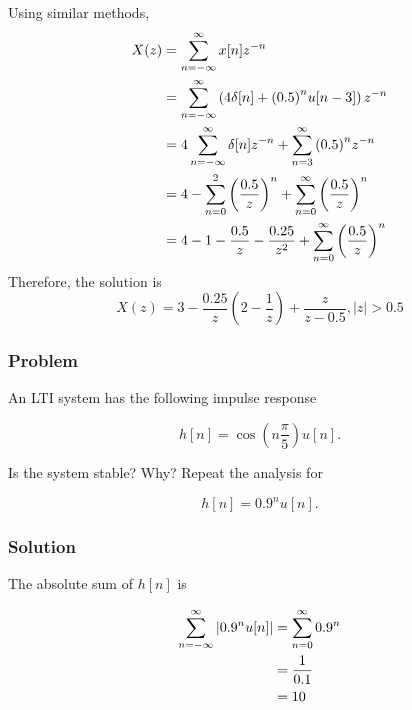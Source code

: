 Using similar methods,
	\begin{equation}
	\begin{aligned}
  X(z) &= \sum\limits_{n =  - \infty }^\infty  {x[n]{z^{ - n}}}  \hfill \\
   &= \sum\limits_{n =  - \infty }^\infty  {\left( {4\delta [n] + {{\left( {0.5} \right)}^n}u[n - 3]} \right){z^{ - n}}}  \hfill \\
   &= 4\sum\limits_{n =  - \infty }^\infty  {\delta [n]} {z^{ - n}} + \sum\limits_{n = 3}^\infty  {{{\left( {0.5} \right)}^n}{z^{ - n}}}  \hfill \\
   &= 4 - \sum\limits_{n = 0}^2 {{{\left( {\frac{{0.5}}{z}} \right)}^n}}  + \sum\limits_{n = 0}^\infty  {{{\left( {\frac{{0.5}}{z}} \right)}^n}}  \hfill \\
   &= 4 - 1 - \frac{{0.5}}{z} - \frac{{0.25}}{{{z^2}}} + \sum\limits_{n = 0}^\infty  {{{\left( {\frac{{0.5}}{z}} \right)}^n}}  \hfill \\
\end{aligned} 
	\end{equation}
	Therefore, the solution is
	\begin{equation}
	X(z)= 3 - \frac{{0.25}}{z}\left( {2 - \frac{1}{z}} \right) + \frac{z}{{z - 0.5}},\left| z \right| > 0.5 
    \end{equation}

\subsubsection{Problem}

An LTI system has the following impulse response 

\begin{equation}
h[n]=\cos\left( n\frac{\pi}{5}\right)u[n].
\end{equation}

Is the system stable? Why? Repeat the analysis for

\begin{equation}
    h[n]=0.9^nu[n].
\end{equation}


\subsubsection{Solution}
    
The absolute sum of $h[n]$ is

\begin{equation}
\begin{aligned}
\sum\limits_{n =  - \infty }^\infty  {\left| 0.9^n u[n] \right|}  &= \sum\limits_{n = 0}^\infty  {0.9^n } \hfill \\
   &= \frac{1}{{0.1}} \hfill \\
   &= 10 \hfill \\ 
\end{aligned}
\end{equation}

